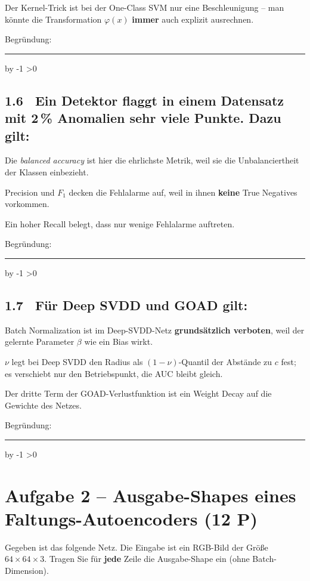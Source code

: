 \documentclass[10pt,a4paper]{article}
\newcommand{\mcbox}{\raisebox{-1pt}{\fbox{\rule{0pt}{7pt}\rule{7pt}{0pt}}}\hspace{6pt}}
\newcommand{\antwortlinien}[1]{%
  \par\vspace{2pt}%
  \newcount\zeilen \zeilen=#1
  \loop
    \noindent\rule{\linewidth}{0.4pt}\par\vspace{11pt}%
    \advance\zeilen by -1
  \ifnum\zeilen>0 \repeat
}
\newcommand{\pkt}[1]{\hfill\textbf{(#1 P)}}
\begin{document}
\mcbox Der Kernel-Trick ist bei der One-Class SVM nur eine Beschleunigung -- man könnte die
Transformation $\varphi(x)$ \textbf{immer} auch explizit ausrechnen.

Begründung:
\antwortlinien{2}

\subsection*{1.6 \ Ein Detektor flaggt in einem Datensatz mit 2\,\% Anomalien sehr viele Punkte.
Dazu gilt:}
\mcbox Die \emph{balanced accuracy} ist hier die ehrlichste Metrik, weil sie die Unbalanciertheit
der Klassen einbezieht.

\mcbox Precision und $F_1$ decken die Fehlalarme auf, weil in ihnen \textbf{keine} True Negatives
vorkommen.

\mcbox Ein hoher Recall belegt, dass nur wenige Fehlalarme auftreten.

Begründung:
\antwortlinien{2}

\subsection*{1.7 \ Für Deep SVDD und GOAD gilt:}
\mcbox Batch Normalization ist im Deep-SVDD-Netz \textbf{grundsätzlich verboten}, weil der
gelernte Parameter $\beta$ wie ein Bias wirkt.

\mcbox $\nu$ legt bei Deep SVDD den Radius als $(1-\nu)$-Quantil der Abstände zu $c$ fest; es
verschiebt nur den Betriebspunkt, die AUC bleibt gleich.

\mcbox Der dritte Term der GOAD-Verlustfunktion ist ein Weight Decay auf die Gewichte des Netzes.

Begründung:
\antwortlinien{2}

\newpage
\section*{Aufgabe 2 -- Ausgabe-Shapes eines Faltungs-Autoencoders \pkt{12}}

Gegeben ist das folgende Netz. Die Eingabe ist ein RGB-Bild der Größe $64\times64\times3$.
Tragen Sie für \textbf{jede} Zeile die Ausgabe-Shape ein (ohne Batch-Dimension).
\end{document}
